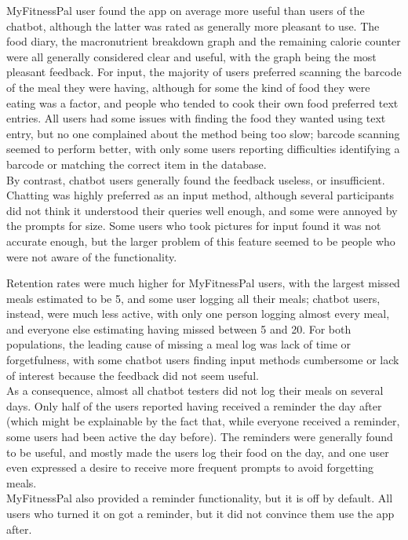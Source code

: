 MyFitnessPal user found the app on average more useful than users of the chatbot, although the latter was rated as generally more pleasant to use. The food diary, the macronutrient breakdown graph and the remaining calorie counter were all generally considered clear and useful, with the graph being the most pleasant feedback. For input, the majority of users preferred scanning the barcode of the meal they were having, although for some the kind of food they were eating was a factor, and people who tended to cook their own food preferred text entries. All users had some issues with finding the food they wanted using text entry, but no one complained about the method being too slow; barcode scanning seemed to perform better, with only some users reporting difficulties identifying a barcode or matching the correct item in the database. \\
By contrast, chatbot users generally found the feedback useless, or insufficient. Chatting was highly preferred as an input method, although several participants did not think it understood their queries well enough, and some were annoyed by the prompts for size. Some users who took pictures for input found it was not accurate enough, but the larger problem of this feature seemed to be people who were not aware of the functionality.

Retention rates were much higher for MyFitnessPal users, with the largest missed meals estimated to be 5, and some user logging all their meals; chatbot users, instead, were much less active, with only one person logging almost every meal, and everyone else estimating having missed between 5 and 20. For both populations, the leading cause of missing a meal log was lack of time or forgetfulness, with some chatbot users finding input methods cumbersome or lack of interest because the feedback did not seem useful. \\
As a consequence, almost all chatbot testers did not log their meals on several days. Only half of the users reported having received a reminder the day after (which might be explainable by the fact that, while everyone received a reminder, some users had been active the day before). The reminders were generally found to be useful, and mostly made the users log their food on the day, and one user even expressed a desire to receive more frequent prompts to avoid forgetting meals. \\
MyFitnessPal also provided a reminder functionality, but it is off by default. All users who turned it on got a reminder, but it did not convince them use the app after. 

